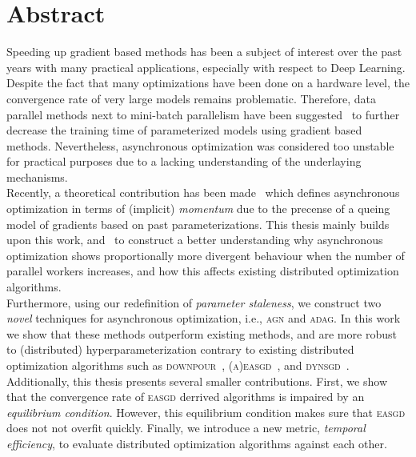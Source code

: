 %
%
%

\newpage
\chapter*{Abstract}

Speeding up gradient based methods has been a subject of interest over the past years with many practical applications, especially with respect to Deep Learning. Despite the fact that many optimizations have been done on a hardware level, the convergence rate of very large models remains problematic. Therefore, data parallel methods next to mini-batch parallelism have been suggested~\cite{dean2012large, ho2013more, hadjis2016omnivore, recht2011hogwild, louppe2010zealous, jiang2017heterogeneity, zhang2015deep} to further decrease the training time of parameterized models using gradient based methods. Nevertheless, asynchronous optimization was considered too unstable for practical purposes due to a lacking understanding of the underlaying mechanisms.\\

Recently, a theoretical contribution has been made~\cite{implicitmomentum} which defines asynchronous optimization in terms of (implicit) \emph{momentum} due to the precense of a queing model of gradients based on past parameterizations. This thesis mainly builds upon this work, and~\cite{zhang2015deep} to construct a better understanding why asynchronous optimization shows proportionally more divergent behaviour when the number of parallel workers increases, and how this affects existing distributed optimization algorithms.\\

Furthermore, using our redefinition of \emph{parameter staleness}, we construct two \emph{novel} techniques for asynchronous optimization, i.e., \textsc{agn} and \textsc{adag}. In this work we show that these methods outperform existing methods, and are more robust to (distributed) hyperparameterization contrary to existing distributed optimization algorithms such as \textsc{downpour}~\cite{dean2012large}, \textsc{(a)easgd}~\cite{zhang2015deep}, and \textsc{dynsgd}~\cite{jiang2017heterogeneity}. Additionally, this thesis presents several smaller contributions. First, we show that the convergence rate of \textsc{easgd} derrived algorithms is impaired by an \emph{equilibrium condition}. However, this equilibrium condition makes sure that \textsc{easgd} does not not overfit quickly. Finally, we introduce a new metric, \emph{temporal efficiency}, to evaluate distributed optimization algorithms against each other.
